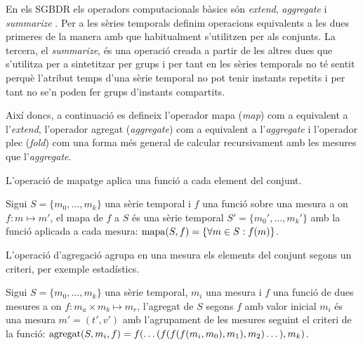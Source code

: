En els SGBDR els operadors computacionals bàsics són \emph{extend},
\emph{aggregate} i \emph{summarize} \parencite{date:introduction}.
Per a les sèries temporals definim operacions equivalents a les dues
primeres de la manera amb que habitualment s'utilitzen per als
conjunts. La tercera, el \emph{summarize}, és una operació creada a
partir de les altres dues que s'utilitza per a sintetitzar per grups i
per tant en les sèries temporals no té sentit perquè l'atribut temps
d'una sèrie temporal no pot tenir instants repetits i per tant no se'n
poden fer grups d'instants compartits. 


Així doncs, a continuació es defineix l'operador mapa (\emph{map}) com
a equivalent a l'\emph{extend}, l'operador agregat (\emph{aggregate})
com a equivalent a l'\emph{aggregate} i l'operador plec (\emph{fold})
com una forma més general de calcular recursivament amb les mesures
que l'\emph{aggregate}.




L'operació de mapatge aplica una funció a cada element del conjunt.
\begin{definition}[mapa]
  Sigui $S=\{m_0, \dotsc, m_k\}$ una sèrie temporal i $f$ una funció
  sobre una mesura a on $f:m\mapsto m'$, el mapa de $f$ a $S$ és una
  sèrie temporal $S'=\{m_0', \dotsc, m_k'\}$ amb la funció aplicada a
  cada mesura: $\operatorname*{mapa}(S,f) = \{\forall m\in S : f(m) \}$.
\end{definition}


L'operació d'agregació agrupa en una mesura els elements del conjunt
segons un criteri, per exemple estadístics.
\begin{definition}[agregat]
  Sigui $S=\{m_0, \dotsc, m_k\}$ una sèrie temporal, $m_i$ una mesura
  i $f$ una funció de dues mesures a on $f: m_a \times m_b \mapsto
  m_r$, l'agregat de $S$ segons $f$ amb valor inicial $m_i$ és una
  mesura $m' = (t',v')$ amb l'agrupament de les mesures seguint el
  criteri de la funció: $\operatorname*{agregat}(S,m_i,f) = f(\dots(
  f(f(f(m_i,m_0),m_1),\allowbreak m_2 )\dots),\allowbreak m_k)$.
\end{definition}

